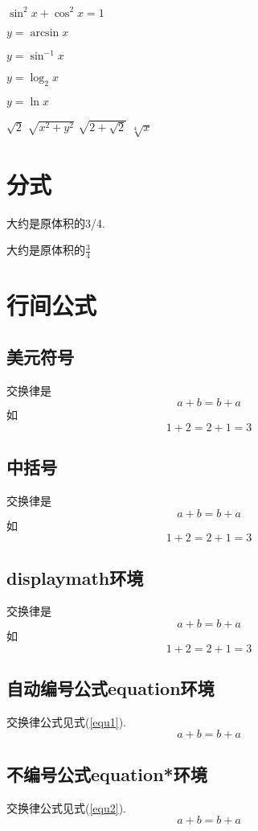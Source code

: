 \documentclass{article}
\begin{document}
    $\sin^2x+\cos^2x=1$

    $y=\arcsin x$

    $y=\sin^{-1}x$

    $y=\log_2x$

    $y=\ln x$

    $\sqrt{2}$
    $\sqrt{x^2 + y^2}$
    $\sqrt{2+\sqrt{2}}$
    $\sqrt[4]{x}$
    \section{分式}
    大约是原体积的3/4.

    大约是原体积的$\frac{3}{4}$
    \section{行间公式}
    \subsection{美元符号}
    交换律是$$a+b=b+a$$如$$1+2=2+1=3$$
    \subsection{中括号}
    交换律是\[a+b=b+a\]如\[1+2=2+1=3\]
    \subsection{displaymath环境}
    交换律是\begin{displaymath}a+b=b+a\end{displaymath}如\begin{displaymath}1+2=2+1=3\end{displaymath}
    \subsection{自动编号公式equation环境}
    交换律公式见式(\ref{equ1}).
    \begin{equation}
        a+b=b+a\label{equ1}
    \end{equation}
    \subsection{不编号公式equation*环境}
    交换律公式见式(\ref{equ2}).
    \begin{equation*}
        a+b=b+a\label{equ2}
    \end{equation*}
\end{document}
